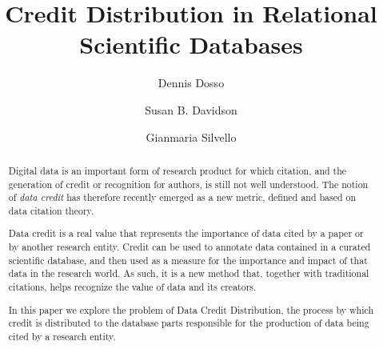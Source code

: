 \documentclass[preprint,12pt,sort&compress]{elsarticle}
\begin{document}
\begin{frontmatter}



\title{Credit Distribution in Relational Scientific Databases}




\author[lab1]{Dennis Dosso}
\author[lab2]{Susan B. Davidson}
\author[lab1]{Gianmaria Silvello}
\address[lab1]{Department of Information Engineering, University of Padua, Italy}
\address[lab2]{Department of Computer and Information Science, University of Pennsylvania, USA}



\begin{abstract}
Digital data is an important form of research product for which citation, and the generation of credit or recognition for authors, is still not well understood.
The notion of {\em data credit} has therefore recently emerged as a new metric, defined and based on data citation theory. 

Data credit is a real value that represents the importance of data cited by a paper or by another research entity. Credit can be used to annotate data contained in a curated scientific database, and then used as a measure for the importance and impact of that data in the research world. As such, it is a new method that, together with traditional citations, helps recognize the value of data and its creators.%

In this paper we explore the problem of Data Credit Distribution, the process by which credit is distributed to the database parts   responsible for the production of data being cited by a research entity. 


\end{abstract}
\end{frontmatter}
\end{document}
